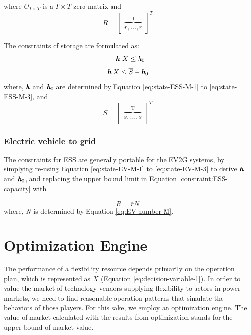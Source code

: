where $O_{T \times T}$ is a $T \times T$ zero matrix and
\begin{equation*}
\overline{R} = \begin{bmatrix}
\overbrace{\overline{r}, \dots, \overline{r}}^\text{T}
\end{bmatrix}^T
\end{equation*}


The constraints of storage are formulated as:
\begin{equation}
\label{constraint:ESS-energy-1}
-\textit{\textbf{h}}~X \leq \textit{\textbf{h}}_0
\end{equation}
\begin{equation}
\label{constraint:ESS-energy-2}
\textit{\textbf{h}}~X \leq \overline{S} -  \textit{\textbf{h}}_0
\end{equation}
where, $\textit{\textbf{h}}$ and $\textit{\textbf{h}}_0$ are determined by Equation \eqref{eq:state-ESS-M-1} to \eqref{eq:state-ESS-M-3}, and
\begin{equation*}
\overline{S} = \begin{bmatrix}
\overbrace{\overline{s}, \dots, \overline{s}}^\text{T}
\end{bmatrix}^T
\end{equation*}

\subsubsection{Electric vehicle to grid}

The constraints for ESS are generally portable for the EV2G systems, by simplying re-using Equation \eqref{eq:state-EV-M-1} to \eqref{eq:state-EV-M-3} to derive $\textit{\textbf{h}}$ and $\textit{\textbf{h}}_0$, and replacing the upper bound limit in Equation \ref{constraint:ESS-capacity} with

\begin{equation}
\overline{R} = \overline{r}N
\end{equation}
where, $N$ is determined by Equation \eqref{eq:EV-number-M}. 




\section{Optimization Engine}
The performance of a flexibility resource depends primarily on the operation plan, which is represented as $X$ (Equation \ref{eq:decision-variable-1}). In order to value the market of technology vendors supplying flexibility to actors in power markets, we need to find reasonable operation patterns that simulate the behaviors of those players. For this sake, we employ an optimization engine. The value of market calculated with the results from optimization stands for the upper bound of market value.

